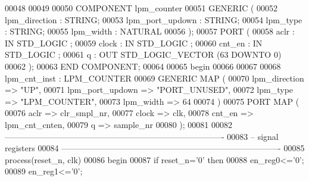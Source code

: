 \begin{DoxyCode}
00048  
00049 
00050     \textcolor{keywordflow}{COMPONENT} lpm\_counter
00051     \textcolor{keywordflow}{GENERIC} (
00052         lpm\_direction           : \textcolor{comment}{STRING};
00053         lpm\_port\_updown     : \textcolor{comment}{STRING};
00054         lpm\_type                    : \textcolor{comment}{STRING};
00055         lpm\_width               : \textcolor{comment}{NATURAL}
00056     );
00057     \textcolor{keywordflow}{PORT} (
00058             aclr        : \textcolor{keywordflow}{IN} \textcolor{comment}{STD\_LOGIC} ;
00059             clock       : \textcolor{keywordflow}{IN} \textcolor{comment}{STD\_LOGIC} ;
00060             cnt\_en  : \textcolor{keywordflow}{IN} \textcolor{comment}{STD\_LOGIC} ;
00061             q           : \textcolor{keywordflow}{OUT} \textcolor{comment}{STD\_LOGIC\_VECTOR} (\textcolor{vhdllogic}{}\textcolor{vhdllogic}{63} \textcolor{keywordflow}{DOWNTO} \textcolor{vhdllogic}{}\textcolor{vhdllogic}{0})
00062     );
00063     \textcolor{keywordflow}{END} \textcolor{keywordflow}{COMPONENT};
00064 
00065 \textcolor{vhdlkeyword}{begin}
00066     
00067     
00068             lpm_cnt_inst : LPM\_COUNTER
00069     \textcolor{keywordflow}{GENERIC} \textcolor{keywordflow}{MAP} (
00070         lpm\_direction       => \textcolor{keyword}{"UP"},
00071         lpm\_port\_updown     => \textcolor{keyword}{"PORT\_UNUSED"},
00072         lpm\_type            => \textcolor{keyword}{"LPM\_COUNTER"},
00073         lpm\_width           => \textcolor{vhdllogic}{64}
00074     \textcolor{vhdlchar}{)}
00075     \textcolor{keywordflow}{PORT} \textcolor{keywordflow}{MAP} (
00076         aclr        => clr_smpl_nr,
00077         clock   => clk,
00078         cnt\_en  => lpm_cnt_cnten,
00079         q           => sample_nr
00080     \textcolor{vhdlchar}{)};
00081 
00082 \textcolor{keyword}{-------------------------------------------------------------------------------}
00083 \textcolor{keyword}{-- signal registers}
00084 \textcolor{keyword}{-------------------------------------------------------------------------------     }
00085   \textcolor{keywordflow}{process}(reset_n, clk)
00086 \textcolor{vhdlkeyword}{    begin}
00087       \textcolor{keywordflow}{if} \textcolor{vhdlchar}{reset_n}\textcolor{vhdlchar}{=}\textcolor{vhdlchar}{'}\textcolor{vhdllogic}{}\textcolor{vhdllogic}{0}\textcolor{vhdlchar}{'} \textcolor{keywordflow}{then} 
00088        \textcolor{vhdlchar}{en_reg0}\textcolor{vhdlchar}{<=}\textcolor{vhdlchar}{'}\textcolor{vhdllogic}{}\textcolor{vhdllogic}{0}\textcolor{vhdlchar}{'};
00089        \textcolor{vhdlchar}{en_reg1}\textcolor{vhdlchar}{<=}\textcolor{vhdlchar}{'}\textcolor{vhdllogic}{}\textcolor{vhdllogic}{0}\textcolor{vhdlchar}{'};

\end{DoxyCode}
